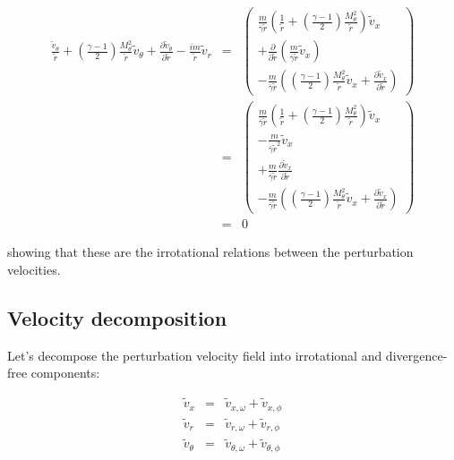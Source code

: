 \begin{eqnarray}
\frac{  \widetilde{v}_{\theta}}{\widetilde{r}}
+ 
\left(\frac{\gamma-1}{2} \right)
\frac{M_{\theta}^2}{\widetilde{r}}
\widetilde{v}_{\theta}
+
\frac{\partial \widetilde{v}_{\theta}}{\partial \widetilde{r}} 
-\frac{i m}{\widetilde{r}}
\widetilde{v}_r
&=&
\left(
\begin{array}{r}
\frac{m}{\overline{\gamma}\widetilde{r}}
\left(
\frac{1}{\widetilde{r}}
+ 
\left(\frac{\gamma-1}{2} \right)
\frac{M_{\theta}^2}{\widetilde{r}}
\right)
\widetilde{v}_{x}
\\
+
\frac{\partial }{\partial \widetilde{r}} 
\left(
\frac{m}{\overline{\gamma} \widetilde{r}} \widetilde{v}_{x}
\right)
\\
-\frac{ m}
{ \overline{\gamma}
\widetilde{r}}
\left(
\left(\frac{\gamma-1}{2} \right)
\frac{M_{\theta}^2}{\widetilde{r}}
\widetilde{v}_x
+
\frac{\partial \widetilde{v}_x}{\partial \widetilde{r}} 
\right)
\end{array}
\right)
\nonumber
\\
&=&
\left(
\begin{array}{r}
\frac{m}{\overline{\gamma}\widetilde{r}}
\left(
\frac{1}{\widetilde{r}}
+ 
\left(\frac{\gamma-1}{2} \right)
\frac{M_{\theta}^2}{\widetilde{r}}
\right)
\widetilde{v}_{x}
\\
-
\frac{m}{\overline{\gamma} \widetilde{r}^2} \widetilde{v}_{x}
\\
+
\frac{m}{\overline{\gamma} \widetilde{r}} 
\frac{\partial \widetilde{v}_{x}
 }{\partial \widetilde{r}} 
\\
-\frac{ m}
{ \overline{\gamma}
\widetilde{r}}
\left(
\left(\frac{\gamma-1}{2} \right)
\frac{M_{\theta}^2}{\widetilde{r}}
\widetilde{v}_x
+
\frac{\partial \widetilde{v}_x}{\partial \widetilde{r}} 
\right)
\end{array}
\right)
\nonumber
\\
&=& 0
\nonumber
\end{eqnarray}

showing that these are the irrotational relations between the
perturbation velocities.

\subsection{Velocity decomposition}

Let's decompose the perturbation velocity field into
irrotational and divergence-free components:

\begin{eqnarray}
\widetilde{v}_x &=& 
\widetilde{v}_{x,\omega}
+\widetilde{v}_{x,\phi}
\nonumber
\\
\widetilde{v}_r &=& 
\widetilde{v}_{r,\omega}
+\widetilde{v}_{r,\phi}
\nonumber
\\
\widetilde{v}_{\theta} &=& 
\widetilde{v}_{\theta,\omega}
+\widetilde{v}_{\theta,\phi}
\nonumber
\end{eqnarray}

